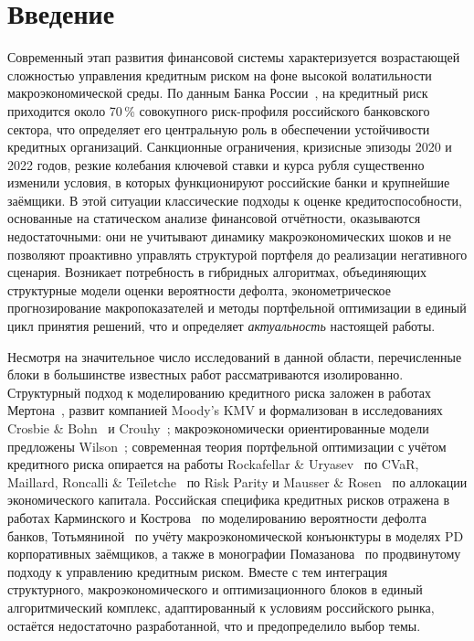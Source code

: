 \documentclass[]{article}
\begin{document}
	

	\newpage
	\tableofcontents

	\newpage
	\section*{Введение}

	Современный этап развития финансовой системы характеризуется возрастающей сложностью управления
	кредитным риском на фоне высокой волатильности макроэкономической среды. По данным Банка
	России~\cite{cbr_fsr}, на кредитный риск приходится около 70\,\% совокупного риск-профиля
	российского банковского сектора, что определяет его центральную роль в обеспечении устойчивости
	кредитных организаций. Санкционные
	ограничения, кризисные эпизоды 2020 и 2022 годов, резкие колебания ключевой ставки и курса рубля
	существенно изменили условия, в которых функционируют российские банки и крупнейшие заёмщики.
	В этой ситуации классические подходы к оценке кредитоспособности, основанные на статическом анализе
	финансовой отчётности, оказываются недостаточными: они не учитывают динамику макроэкономических
	шоков и не позволяют проактивно управлять структурой портфеля до реализации негативного сценария.
	Возникает потребность в гибридных алгоритмах, объединяющих структурные модели оценки вероятности
	дефолта, эконометрическое прогнозирование макропоказателей и методы портфельной оптимизации
	в единый цикл принятия решений, что и определяет \emph{актуальность} настоящей работы.

	Несмотря на значительное число исследований в данной области, перечисленные блоки в большинстве
	известных работ рассматриваются изолированно. Структурный подход к моделированию кредитного риска
	заложен в работах Мертона~\cite{merton1974}, развит компанией Moody's KMV и формализован в
	исследованиях Crosbie \& Bohn~\cite{crosbie2003} и Crouhy~\cite{crouhy2000}; макроэкономически
	ориентированные модели предложены Wilson~\cite{wilson1997}; современная теория портфельной
	оптимизации с учётом кредитного риска опирается на работы Rockafellar \& Uryasev~\cite{rockafellar2000}
	по CVaR, Maillard, Roncalli \& Teïletche~\cite{maillard2010} по Risk Parity и
	Mausser \& Rosen~\cite{mausser2008} по аллокации экономического капитала. Российская специфика
	кредитных рисков отражена в работах Карминского и Кострова~\cite{karminsky2015} по моделированию
	вероятности дефолта банков, Тотьмяниной~\cite{totmianina2014} по учёту макроэкономической
	конъюнктуры в моделях PD корпоративных заёмщиков, а также в монографии
	Помазанова~\cite{pomazanov2016} по продвинутому подходу к управлению кредитным риском.
	Вместе с тем интеграция
	структурного, макроэкономического и оптимизационного блоков в единый алгоритмический комплекс,
	адаптированный к условиям российского рынка, остаётся недостаточно разработанной, что и
	предопределило выбор темы.
\end{document}
